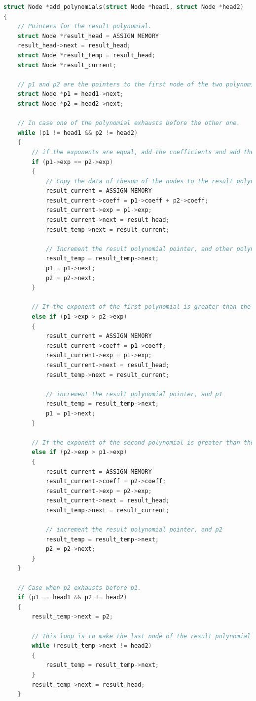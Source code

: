 \documentclass[11pt]{article}
\begin{document}
\begin{lstlisting}[language=C]
struct Node *add_polynomials(struct Node *head1, struct Node *head2)
{
	// Pointers for the result polynomial.
	struct Node *result_head = ASSIGN MEMORY
	result_head->next = result_head;
	struct Node *result_temp = result_head;
	struct Node *result_current;

	// p1 and p2 are the pointers to the first node of the two polynomials.
	struct Node *p1 = head1->next;
	struct Node *p2 = head2->next;

	// In case one of the polynomial exhausts before the other one.
	while (p1 != head1 && p2 != head2)
	{
		// if the exponents are equal, add the coefficients and add the node to the result polynomial.
		if (p1->exp == p2->exp)
		{
			// Copy the data of thesum of the nodes to the result polynomial.
			result_current = ASSIGN MEMORY
			result_current->coeff = p1->coeff + p2->coeff;
			result_current->exp = p1->exp;
			result_current->next = result_head;
			result_temp->next = result_current;

			// Increment the result polynomial pointer, and other polynomial pointers.
			result_temp = result_temp->next;
			p1 = p1->next;
			p2 = p2->next;
		}

		// If the exponent of the first polynomial is greater than the second one, add the node to the result polynomial.
		else if (p1->exp > p2->exp)
		{
			result_current = ASSIGN MEMORY
			result_current->coeff = p1->coeff;
			result_current->exp = p1->exp;
			result_current->next = result_head;
			result_temp->next = result_current;

			// increment the result polynomial pointer, and p1
			result_temp = result_temp->next;
			p1 = p1->next;
		}

		// If the exponent of the second polynomial is greater than the first one, add the node to the result polynomial.
		else if (p2->exp > p1->exp)
		{
			result_current = ASSIGN MEMORY
			result_current->coeff = p2->coeff;
			result_current->exp = p2->exp;
			result_current->next = result_head;
			result_temp->next = result_current;

			// increment the result polynomial pointer, and p2
			result_temp = result_temp->next;
			p2 = p2->next;
		}
	}

	// Case when p2 exhausts before p1.
	if (p1 == head1 && p2 != head2)
	{
		result_temp->next = p2;

		// This loop is to make the last node of the result polynomial point to the head of the result polynomial.
		while (result_temp->next != head2)
		{
			result_temp = result_temp->next;
		}
		result_temp->next = result_head;
	}


\end{lstlisting}
\end{document}
